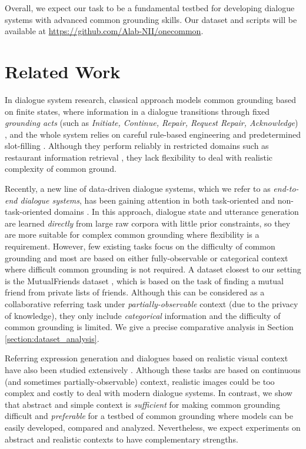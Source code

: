 \documentclass[letterpaper]{article}
\begin{document}
Overall, we expect our task to be a fundamental testbed for developing dialogue systems with advanced common grounding skills. Our dataset and scripts will be available at \url{https://github.com/Alab-NII/onecommon}.

\section{Related Work}
\label{section:related_work}

In dialogue system research, classical approach models common grounding based on finite states, where information in a dialogue transitions through fixed \emph{grounding acts} (such as \emph{Initiate, Continue, Repair, Request Repair, Acknowledge}) \cite{traum1994computational}, and the whole system relies on careful rule-based engineering and predetermined slot-filling \cite{young2013pomdp}. Although they perform reliably in restricted domains such as restaurant information retrieval \cite{williams2016dialog}, they lack flexibility to deal with realistic complexity of common ground.

Recently, a new line of data-driven dialogue systems, which we refer to as \emph{end-to-end dialogue systems}, has been gaining attention in both task-oriented \cite{bordes2016learning,lewis2017deal} and non-task-oriented domains \cite{vinyals2015neural,serban2016hierarchical}. In this approach, dialogue state and utterance generation are learned \emph{directly} from large raw corpora with little prior constraints, so they are more suitable for complex common grounding where flexibility is a requirement. However, few existing tasks focus on the difficulty of common grounding and most are based on either fully-observable or categorical context \cite{de2017guesswhat,bordes2016learning,lewis2017deal} where difficult common grounding is not required. A dataset closest to our setting is the MutualFriends dataset \cite{he2017learning}, which is based on the task of finding a mutual friend from private lists of friends. Although this can be considered as a collaborative referring task under \emph{partially-observable} context (due to the privacy of knowledge), they only include \emph{categorical} information and the difficulty of common grounding is limited. We give a precise comparative analysis in Section \ref{section:dataset_analysis}.

Referring expression generation and dialogues based on realistic visual context have also been studied extensively \cite{kazemzadeh2014referit,das2017visual,das2017visdial_rl}. Although these tasks are based on continuous (and sometimes partially-observable) context, realistic images could be too complex and costly to deal with modern dialogue systems. In contrast, we show that abstract and simple context is \emph{sufficient} for making common grounding difficult and \emph{preferable} for a testbed of common grounding where models can be easily developed, compared and analyzed. Nevertheless, we expect experiments on abstract and realistic contexts to have complementary strengths.
\end{document}
